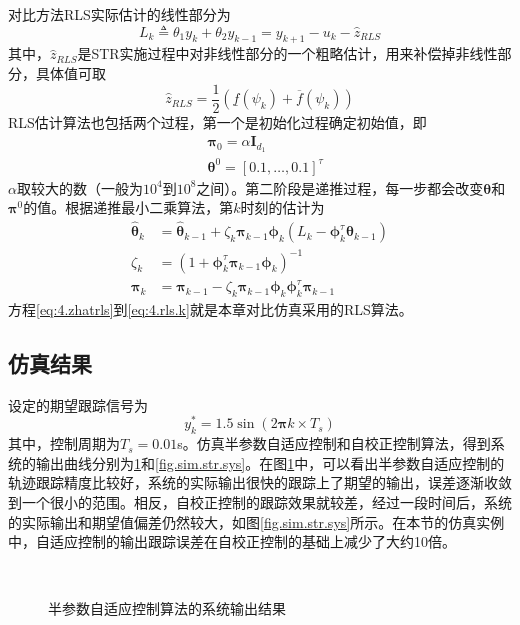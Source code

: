 对比方法RLS实际估计的线性部分为
\begin{equation}\label{eq:4.zrls}
L_{k}\triangleq\theta_{1}y_{k} + \theta_{2} y_{k-1}=y_{k+1}-u_{k}-\hat{z}_{RLS}
\end{equation}
其中，$\hat{z}_{RLS}$是STR实施过程中对非线性部分的一个粗略估计，用来补偿掉非线性部分，具体值可取
\begin{equation}\label{eq:4.zhatrls}
\hat{z}_{RLS}=\frac12 (\underline{f}(\psi_{k})+\overline{f}(\psi_{k})) 
\end{equation}
RLS估计算法也包括两个过程，第一个是初始化过程确定初始值，即
\begin{equation}\label{eq:4.rls.0}
\begin{split}
&\bm{\pi}_{0}=\alpha \bm{I}_{d_{1}}\\
&\bm{\theta}^{0}=[0.1,\dots,0.1]^{\tau}
\end{split}
\end{equation}
$\alpha$取较大的数（一般为$10^{4}$到$10^{8}$之间）。第二阶段是递推过程，每一步都会改变$\bm{\theta}$和$\bm{\pi}^{0}$的值。根据递推最小二乘算法，第$k$时刻的估计为
\begin{equation}\label{eq:4.rls.k}
\begin{split}
\hat{\bm{\theta}}_{k}&=\hat{\bm{\theta}}_{k-1}+ \zeta_{k} \bm{\pi}_{k-1} \bm{\phi}_{k} (L_{k}-\bm{\phi}_k^\tau \bm{\theta}_{k-1})\\
\zeta_k&=(1+\bm{\phi}_{k}^{\tau} \bm{\pi}_{k-1} \bm{\phi}_{k})^{-1}\\
\bm{\pi}_{k}&=\bm{\pi}_{k-1}-\zeta_k \bm{\pi}_{k-1} \bm{\phi}_{k} \bm{\phi}_{k}^{\tau} \bm{\pi}_{k-1}
\end{split}
\end{equation}
方程\eqref{eq:4.zhatrls}到\eqref{eq:4.rls.k}就是本章对比仿真采用的RLS算法。

\subsection{仿真结果}\label{sect:4.4.2}
设定的期望跟踪信号为
\begin{equation}\label{eq:4.sim.yd}
y_{k}^{*} = 1.5\sin(2\bm{\pi} k\times T_{s})
\end{equation}
其中，控制周期为$T_{s}=0.01$s。仿真半参数自适应控制和自校正控制算法，得到系统的输出曲线分别为\ref{fig.sim.elm.sys}和\ref{fig.sim.str.sys}。在图\ref{fig.sim.elm.sys}中，可以看出半参数自适应控制的轨迹跟踪精度比较好，系统的实际输出很快的跟踪上了期望的输出，误差逐渐收敛到一个很小的范围。相反，自校正控制的跟踪效果就较差，经过一段时间后，系统的实际输出和期望值偏差仍然较大，如图\ref{fig.sim.str.sys}所示。在本节的仿真实例中，自适应控制的输出跟踪误差在自校正控制的基础上减少了大约10倍。
\begin{figure}[!htb]
	\centering
	\\
	\caption{半参数自适应控制算法的系统输出结果}
	\label{fig.sim.elm.sys}
\end{figure}

